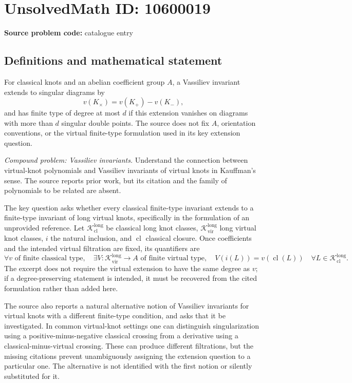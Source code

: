 \documentclass[11pt]{article}
\begin{document}
\section*{UnsolvedMath ID: 10600019}
\textbf{Source problem code:} catalogue entry
\subsection{Definitions and mathematical statement}
For classical knots and an abelian coefficient group \(A\), a Vassiliev invariant extends to singular diagrams by
\[
 v(K_\times)=v(K_+)-v(K_-),
\]
and has finite type of degree at most \(d\) if this extension vanishes on diagrams with more than \(d\) singular double points. The source does not fix \(A\), orientation conventions, or the virtual finite-type formulation used in its key extension question.

\emph{Compound problem: Vassiliev invariants.} Understand the connection between virtual-knot polynomials and Vassiliev invariants of virtual knots in Kauffman's sense. The source reports prior work, but its citation and the family of polynomials to be related are absent.

The key question asks whether every classical finite-type invariant extends to a finite-type invariant of long virtual knots, specifically in the formulation of an unprovided reference. Let \(\mathcal K_{\mathrm{cl}}^{\mathrm{long}}\) be classical long knot classes, \(\mathcal K_{\mathrm{vir}}^{\mathrm{long}}\) long virtual knot classes, \(i\) the natural inclusion, and \(\operatorname{cl}\) classical closure. Once coefficients and the intended virtual filtration are fixed, its quantifiers are
\[
 \forall v\text{ of finite classical type},\quad
 \exists V:\mathcal K_{\mathrm{vir}}^{\mathrm{long}}\to A
 \text{ of finite virtual type},\quad
 V(i(L))=v(\operatorname{cl}(L))
 \quad\forall L\in\mathcal K_{\mathrm{cl}}^{\mathrm{long}}.
\]
The excerpt does not require the virtual extension to have the same degree as \(v\); if a degree-preserving statement is intended, it must be recovered from the cited formulation rather than added here.

The source also reports a natural alternative notion of Vassiliev invariants for virtual knots with a different finite-type condition, and asks that it be investigated. In common virtual-knot settings one can distinguish singularization using a positive-minus-negative classical crossing from a derivative using a classical-minus-virtual crossing. These can produce different filtrations, but the missing citations prevent unambiguously assigning the extension question to a particular one. The alternative is not identified with the first notion or silently substituted for it.
\end{document}

